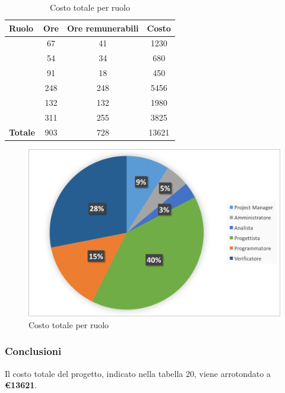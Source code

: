 \begin{table}[h]
	\begin{center}
		\begin{tabular}{|l|c|c|c|}
			\hline
			\textbf{Ruolo}	& \textbf{Ore} &	\textbf{Ore remunerabili}	 &\textbf{Costo} \\
			\hline
			\textit{\Pm}	&	67	&	41	&	1230	\\
			\hline
			\textit{\Am}	&	54	&	34	&	680	\\
			\hline
			\textit{\An}	&	91	&	18	&	450	\\
			\hline
			\textit{\Prog}	&	248	&	248	&	5456	\\
			\hline
			\textit{\Progr}	&	132	&	132	&	1980	\\
			\hline
			\textit{\Ver}	&	311	&	255	&	3825	\\
			\hline
			\textbf{Totale}	&	903	&	728	&	13621	\\
			\hline
		\end{tabular}
	\end{center}
	\caption{Costo totale per ruolo}
\end{table}

\begin{figure}[H]
	\centering 
	\includegraphics[scale=0.7]{Immagini/GraficiTorteSezione6/TOT.png}
	\caption{Costo totale per ruolo}
\end{figure}

\subsubsection{Conclusioni}
Il costo totale del progetto, indicato nella tabella 20, viene arrotondato a \textbf{\euro 13621}.\\